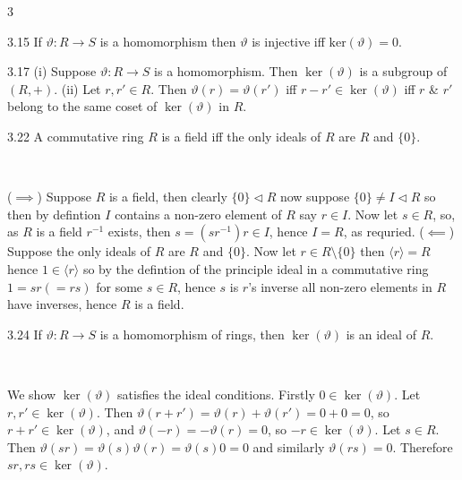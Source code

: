 \documentclass[8pt]{extarticle}
\makeatletter
\renewenvironment{proof}[1][\proofname]{%
  \begin{tcolorbox}[proofpairboxstyle]%
  \pushQED{\qed}%
  \normalfont\itshape #1\@addpunct{.}\ \normalfont\ignorespaces
}{%
  \popQED%
  \end{tcolorbox}%
}
\makeatother
\begin{document}
\begin{multicols*}{3}
        \begin{lemma}{3.15}
            If \(\vartheta: R\to S\) is a homomorphism then \(\vartheta\) is injective iff \(\text{ker}(\vartheta)={0}\).
        \end{lemma}

        \begin{lemma}{3.17}
            (i) Suppose \(\vartheta:R\to S\) is a homomorphism. Then \(\ker(\vartheta)\) is a subgroup of \((R,+)\). (ii) Let \(r,r'\in R\). Then \(\vartheta(r)=\vartheta(r')\) iff \(r-r'\in\ker(\vartheta)\) iff \(r\) \& \(r'\) belong to the same coset of \(\ker(\vartheta)\) in \(R\).
        \end{lemma}

        \begin{proposition}{3.22}
            A commutative ring \(R\) is a field iff the only ideals of \(R\) are \(R\) and \(\{0\}\).
        \end{proposition}

        \begin{proof}
            (\(\implies\)) Suppose \(R\) is a field, then clearly \(\{0\}\lhd R\) now suppose \(\{0\}\ne I\lhd R\) so then by defintion \(I\) contains a non-zero element of \(R\) say \(r\in I\). Now let \(s\in R\), so, as \(R\) is a field \(r^{-1}\) exists, then \(s=(sr^{-1})r\in I\), hence \(I=R\), as requried.
            (\(\impliedby\)) Suppose the only ideals of \(R\) are \(R\) and \(\{0\}\). Now let \(r\in R\setminus\{0\}\) then \(\langle r\rangle=R\) hence \(1\in\langle r\rangle\) so by the defintion of the principle ideal in a commutative ring \(1=sr(=rs)\) for some \(s\in R\), hence \(s\) is \(r\)'s inverse all non-zero elements in \(R\) have inverses, hence \(R\) is a field.
        \end{proof}

        \begin{proposition}{3.24}
            If \(\vartheta:R\to S\) is a homomorphism of rings, then \(\ker(\vartheta)\) is an ideal of \(R\).
        \end{proposition}

        \begin{proof}
            We show \(\ker(\vartheta)\) satisfies the ideal conditions. Firstly \(0\in\ker(\vartheta)\). Let \(r,r'\in\ker(\vartheta)\). Then \(\vartheta(r+r')=\vartheta(r)+\vartheta(r')=0+0=0\), so \(r+r'\in\ker(\vartheta)\), and \(\vartheta(-r)=-\vartheta(r)=0\), so \(-r\in\ker(\vartheta)\). Let \(s\in R\). Then \(\vartheta(sr)=\vartheta(s)\vartheta(r)=\vartheta(s)0=0\) and similarly \(\vartheta(rs)=0\). Therefore \(sr,rs\in\ker(\vartheta)\).
        \end{proof}


\end{multicols*}
\end{document}
